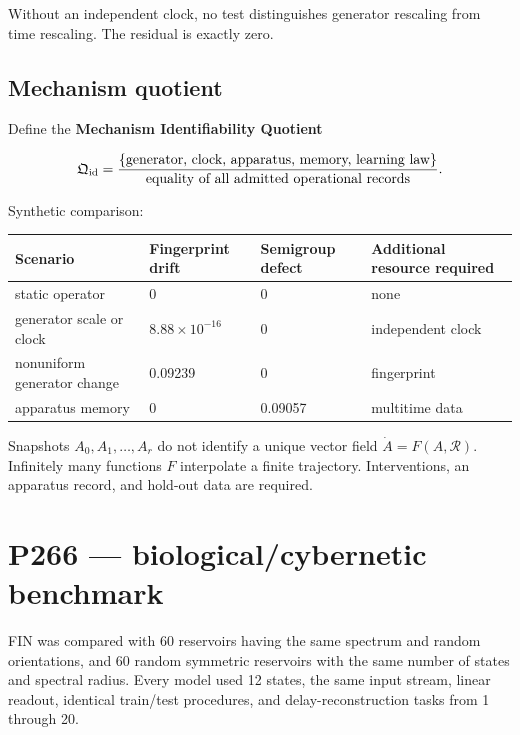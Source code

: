 \documentclass[11pt,a4paper,openany]{report}
\begin{document}
Without an independent clock, no test distinguishes generator rescaling from time rescaling. The residual is exactly zero.

\section{Mechanism quotient}

Define the \textbf{Mechanism Identifiability Quotient}

\[
\mathfrak Q_{\rm id}
=
\frac{
\{\text{generator, clock, apparatus, memory, learning law}\}
}{
\text{equality of all admitted operational records}
}.
\]

Synthetic comparison:

\begin{center}
\begingroup\small
\setlength{\tabcolsep}{2.5pt}
\renewcommand{\arraystretch}{1.16}
\begin{longtable}{@{}p{}p{}p{}p{}@{}}
\toprule
\textbf{Scenario} & \textbf{Fingerprint drift} & \textbf{Semigroup defect} & \textbf{Additional resource required} \\
\midrule
\endhead
static operator & 0 & 0 & none \\
generator scale or clock & \(8.88\times10^{-16}\) & 0 & independent clock \\
nonuniform generator change & 0.09239 & 0 & fingerprint \\
apparatus memory & 0 & 0.09057 & multitime data \\
\bottomrule
\end{longtable}
\endgroup
\end{center}

Snapshots \(A_0,A_1,\ldots,A_r\) do not identify a unique vector field \(\dot A=F(A,\mathcal R)\). Infinitely many functions \(F\) interpolate a finite trajectory. Interventions, an apparatus record, and hold-out data are required.

\chapter{P266 --- biological/\allowbreak{}cybernetic benchmark}

FIN was compared with 60 reservoirs having the same spectrum and random orientations, and 60 random symmetric reservoirs with the same number of states and spectral radius. Every model used 12 states, the same input stream, linear readout, identical train/\allowbreak{}test procedures, and delay-reconstruction tasks from 1 through 20.
\end{document}
